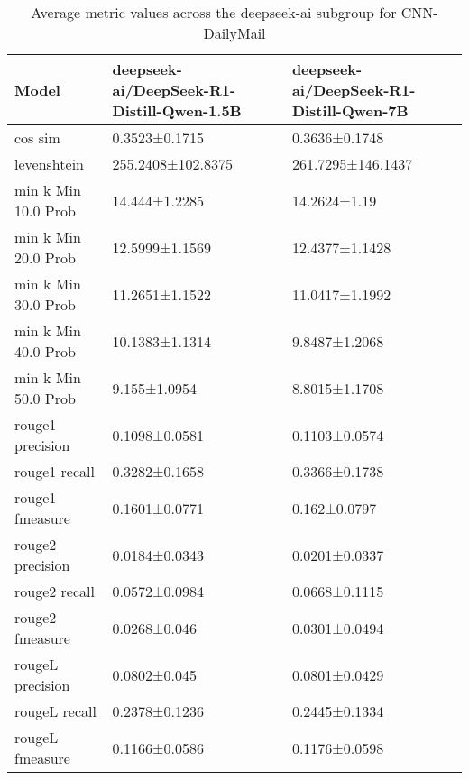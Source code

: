 \begin{table}
\caption{Average metric values across the deepseek-ai subgroup for CNN-DailyMail}
\label{tab:}
\begin{tabular}{lll}
\toprule
Model & deepseek-ai/DeepSeek-R1-Distill-Qwen-1.5B & deepseek-ai/DeepSeek-R1-Distill-Qwen-7B \\
\midrule
cos sim & 0.3523±0.1715 & 0.3636±0.1748 \\
levenshtein & 255.2408±102.8375 & 261.7295±146.1437 \\
min k Min 10.0 Prob & 14.444±1.2285 & 14.2624±1.19 \\
min k Min 20.0 Prob & 12.5999±1.1569 & 12.4377±1.1428 \\
min k Min 30.0 Prob & 11.2651±1.1522 & 11.0417±1.1992 \\
min k Min 40.0 Prob & 10.1383±1.1314 & 9.8487±1.2068 \\
min k Min 50.0 Prob & 9.155±1.0954 & 8.8015±1.1708 \\
rouge1 precision & 0.1098±0.0581 & 0.1103±0.0574 \\
rouge1 recall & 0.3282±0.1658 & 0.3366±0.1738 \\
rouge1 fmeasure & 0.1601±0.0771 & 0.162±0.0797 \\
rouge2 precision & 0.0184±0.0343 & 0.0201±0.0337 \\
rouge2 recall & 0.0572±0.0984 & 0.0668±0.1115 \\
rouge2 fmeasure & 0.0268±0.046 & 0.0301±0.0494 \\
rougeL precision & 0.0802±0.045 & 0.0801±0.0429 \\
rougeL recall & 0.2378±0.1236 & 0.2445±0.1334 \\
rougeL fmeasure & 0.1166±0.0586 & 0.1176±0.0598 \\
\bottomrule
\end{tabular}
\end{table}
